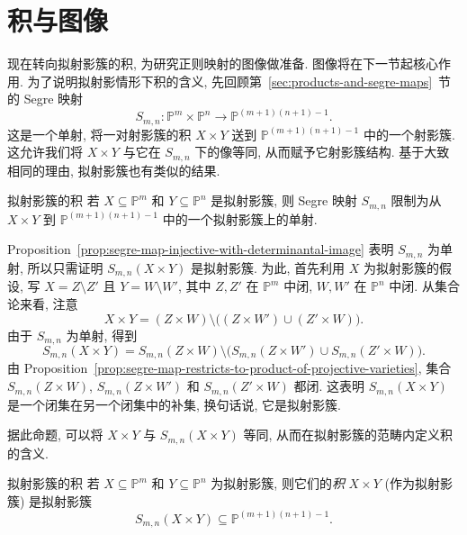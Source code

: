 \section{积与图像}\label{sec:quasiprojective-products-and-graphs}

现在转向拟射影簇的积, 为研究正则映射的图像做准备. 图像将在下一节起核心作用. 为了说明拟射影情形下积的含义, 先回顾第~\ref{sec:products-and-segre-maps}~节的 Segre 映射
\[
  S_{m,n}:\mathbb{P}^{m}\times\mathbb{P}^{n}\to\mathbb{P}^{(m+1)(n+1)-1}.
\]
这是一个单射, 将一对射影簇的积 $X\times Y$ 送到 $\mathbb{P}^{(m+1)(n+1)-1}$ 中的一个射影簇. 这允许我们将 $X\times Y$ 与它在 $S_{m,n}$ 下的像等同, 从而赋予它射影簇结构. 基于大致相同的理由, 拟射影簇也有类似的结果.

\begin{Proposition}{拟射影簇的积}\leavevmode\label{prop:segre-image-of-quasiprojective-product}
若 $X\subseteq\mathbb{P}^{m}$ 和 $Y\subseteq\mathbb{P}^{n}$ 是拟射影簇, 则 Segre 映射 $S_{m,n}$ 限制为从 $X\times Y$ 到 $\mathbb{P}^{(m+1)(n+1)-1}$ 中的一个拟射影簇上的单射.
\end{Proposition}
\begin{Proof}
Proposition~\ref{prop:segre-map-injective-with-determinantal-image} 表明 $S_{m,n}$ 为单射, 所以只需证明 $S_{m,n}(X\times Y)$ 是拟射影簇. 为此, 首先利用 $X$ 为拟射影簇的假设, 写 $X=Z\setminus Z'$ 且 $Y=W\setminus W'$, 其中 $Z,Z'$ 在 $\mathbb{P}^{m}$ 中闭, $W,W'$ 在 $\mathbb{P}^{n}$ 中闭. 从集合论来看, 注意
\[
  X\times Y=(Z\times W)\setminus\bigl((Z\times W')\cup(Z'\times W)\bigr).
\]
由于 $S_{m,n}$ 为单射, 得到
\[
  S_{m,n}(X\times Y)=S_{m,n}(Z\times W)
   \setminus\bigl(S_{m,n}(Z\times W')\cup S_{m,n}(Z'\times W)\bigr).
\]
由 Proposition~\ref{prop:segre-map-restricts-to-product-of-projective-varieties}, 集合 $S_{m,n}(Z\times W)$, $S_{m,n}(Z\times W')$ 和 $S_{m,n}(Z'\times W)$ 都闭. 这表明 $S_{m,n}(X\times Y)$ 是一个闭集在另一个闭集中的补集, 换句话说, 它是拟射影簇.
\end{Proof}

据此命题, 可以将 $X\times Y$ 与 $S_{m,n}(X\times Y)$ 等同, 从而在拟射影簇的范畴内定义积的含义.

\begin{Definition}{拟射影簇的积}\leavevmode\label{def:product-of-quasiprojective-varieties}
若 $X\subseteq\mathbb{P}^{m}$ 和 $Y\subseteq\mathbb{P}^{n}$ 为拟射影簇, 则它们的\emph{积} $X\times Y$ (作为拟射影簇) 是拟射影簇
\[
  S_{m,n}(X\times Y)\subseteq\mathbb{P}^{(m+1)(n+1)-1}.
\]
\end{Definition}

